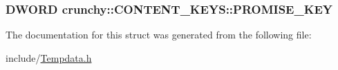 \subsubsection[{P\+R\+O\+M\+I\+S\+E\+\_\+\+K\+E\+Y}]{\setlength{\rightskip}{0pt plus 5cm}D\+W\+O\+R\+D crunchy\+::\+C\+O\+N\+T\+E\+N\+T\+\_\+\+K\+E\+Y\+S\+::\+P\+R\+O\+M\+I\+S\+E\+\_\+\+K\+E\+Y}\label{structcrunchy_1_1_c_o_n_t_e_n_t___k_e_y_s_a37a28b896918cb39a79d25d469506c7a}


The documentation for this struct was generated from the following file\+:\begin{DoxyCompactItemize}
\item 
include/\hyperlink{_tempdata_8h}{Tempdata.\+h}\end{DoxyCompactItemize}
